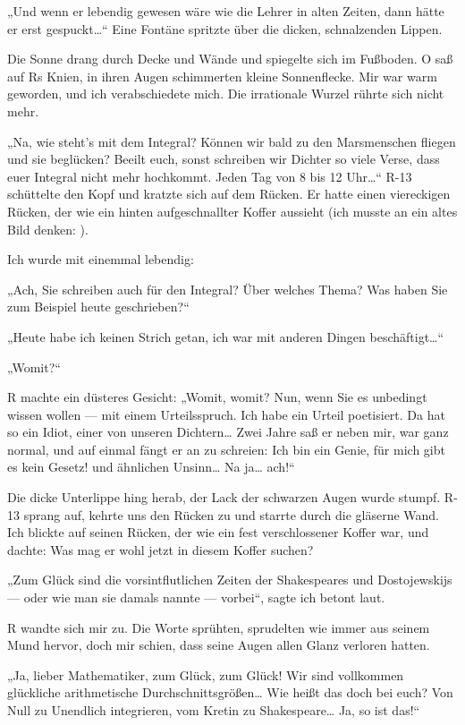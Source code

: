„Und wenn er lebendig gewesen wäre wie die Lehrer in alten Zeiten,
dann hätte er erst gespuckt\ldots{}“ Eine Fontäne spritzte über die
dicken, schnalzenden Lippen.

Die Sonne drang durch Decke und Wände
und spiegelte sich im Fußboden. O saß auf Rs Knien, in ihren Augen
schimmerten kleine Sonnenflecke. Mir war warm geworden, und ich
verabschiedete mich. Die irrationale Wurzel rührte sich nicht
mehr.

„Na, wie steht's mit dem Integral? Können wir bald zu den
Marsmenschen fliegen und sie beglücken? Beeilt euch, sonst
schreiben wir Dichter so viele Verse, dass euer Integral nicht mehr
hochkommt. Jeden Tag von 8 bis 12 Uhr\ldots{}“ R-13 schüttelte den Kopf
und kratzte sich auf dem Rücken. Er hatte einen viereckigen Rücken,
der wie ein hinten aufgeschnallter Koffer aussieht (ich musste an
ein altes Bild denken: ).

Ich wurde mit einemmal lebendig:

„Ach, Sie schreiben auch für den Integral? Über welches Thema? Was
haben Sie zum Beispiel heute geschrieben?“

„Heute habe ich keinen
Strich getan, ich war mit anderen Dingen beschäftigt\ldots{}“

„Womit?“

R machte ein düsteres Gesicht: „Womit, womit? Nun, wenn Sie es
unbedingt wissen wollen — mit einem Urteilsspruch. Ich habe ein
Urteil poetisiert. Da hat so ein Idiot, einer von unseren
Dichtern\ldots{} Zwei Jahre saß er neben mir, war ganz normal, und auf
einmal fängt er an zu schreien: \glq{}Ich bin ein Genie,
für mich gibt es kein Gesetz!{}\grq{} und ähnlichen Unsinn\ldots{} Na
ja\ldots{} ach!“

Die dicke Unterlippe hing herab, der Lack der schwarzen
Augen wurde stumpf. R-13 sprang auf, kehrte uns den Rücken zu und
starrte durch die gläserne Wand. Ich blickte auf seinen Rücken, der
wie ein fest verschlossener Koffer war, und dachte: Was mag er wohl
jetzt in diesem Koffer suchen?

„Zum Glück sind die vorsintflutlichen Zeiten der Shakespeares und
Dostojewskijs — oder wie man sie damals nannte — vorbei“, sagte ich
betont laut.

R wandte sich mir zu. Die Worte sprühten, sprudelten
wie immer aus seinem Mund hervor, doch mir schien, dass seine Augen
allen Glanz verloren hatten.

„Ja, lieber Mathematiker, zum Glück,
zum Glück! Wir sind vollkommen glückliche arithmetische
Durchschnittsgrößen\ldots{} Wie heißt das doch bei euch? Von Null zu
Unendlich integrieren, vom Kretin zu Shakespeare\ldots{} Ja, so ist
das!“

